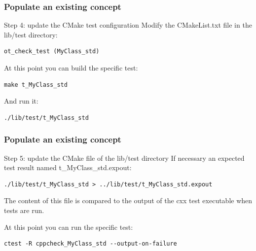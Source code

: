 \documentclass[8pt]{beamer}
\begin{document}
\begin{frame}[fragile]
  \frametitle{Populate an existing concept}
  \begin{block}{Step 4: update the CMake test configuration}
    Modify the CMakeList.txt file in the lib/test directory:\\
\begin{lstlisting}
ot_check_test (MyClass_std)
\end{lstlisting}
    At this point you can build the specific test:\\
\begin{lstlisting}
make t_MyClass_std
\end{lstlisting}
     And run it:\\
\begin{lstlisting}
./lib/test/t_MyClass_std
\end{lstlisting}
  \end{block}
  
\end{frame}
\begin{frame}[fragile]
  \frametitle{Populate an existing concept}
  \begin{block}{Step 5: update the CMake file of the lib/test directory}
    If necessary an expected test result named t\_MyClass\_std.expout:\\
\begin{lstlisting}
./lib/test/t_MyClass_std > ../lib/test/t_MyClass_std.expout
\end{lstlisting}

    The content of this file is compared to the output of the cxx test executable when tests are run.

    At this point you can run the specific test:\\
\begin{lstlisting}
ctest -R cppcheck_MyClass_std --output-on-failure
\end{lstlisting}
  \end{block}
\end{frame}
\end{document}
